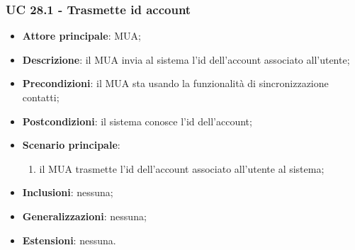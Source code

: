     \subsubsection{UC 28.1 - Trasmette id account} \label{sec:UC28.1}
    \begin{itemize}
        \item \textbf{Attore principale}: MUA;
        \item \textbf{Descrizione}: il MUA invia al sistema l'id dell'account associato all'utente;
        \item \textbf{Precondizioni}: il MUA sta usando la funzionalità di sincronizzazione contatti;
        \item \textbf{Postcondizioni}: il sistema conosce l'id dell'account;
        \item \textbf{Scenario principale}:
            \begin{enumerate}
                \item il MUA trasmette l'id dell'account associato all'utente al sistema;
            \end{enumerate}
        \item \textbf{Inclusioni}: nessuna;
        \item \textbf{Generalizzazioni}: nessuna;
        \item \textbf{Estensioni}: nessuna.
    \end{itemize}

